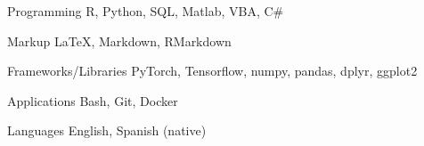 

\begin{cvskills}

  \cvskill
    {Programming} %
    {R, Python, SQL, Matlab, VBA, C\#} %

\cvskill
{Markup}
{\LaTeX, Markdown, RMarkdown}

\cvskill
{Frameworks/Libraries}
{PyTorch, Tensorflow, numpy, pandas, dplyr, ggplot2}

\cvskill
  {Applications}
  {Bash, Git, Docker}




  \cvskill
    {Languages} %
    {English, Spanish (native)} %

\end{cvskills}

